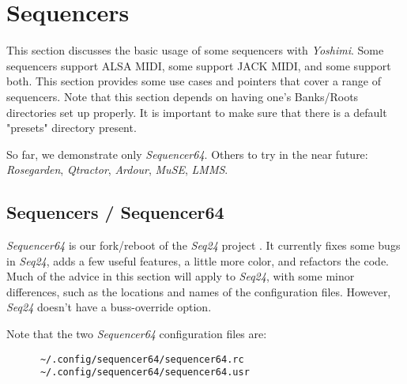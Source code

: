 %
%
%

\section{Sequencers}
\label{sec:sequencers}

   This section discusses the basic usage of some sequencers
   with \textsl{Yoshimi}.
   Some sequencers support ALSA MIDI, some support JACK MIDI, and some
   support both.  This section provides some use cases and pointers that cover
   a range of sequencers.
   Note that this section depends on having one's Banks/Roots directories set
   up properly.  It is important to make sure that there is a default
   "presets" directory present.

   So far, we demonstrate only \textsl{Sequencer64}.
   Others to try in the near future:
      \textsl{Rosegarden},
      \textsl{Qtractor},
      \textsl{Ardour},
      \textsl{MuSE},
      \textsl{LMMS}.

\subsection{Sequencers / Sequencer64}
\label{subsec:sequencers_seq64}

   \textsl{Sequencer64} is our fork/reboot of the \textsl{Seq24}
   project \cite{sequencer64}.
   It currently fixes some bugs in \textsl{Seq24},
   adds a few useful features,
   a little more color, and refactors the code.
   Much of the advice in this section will apply to
   \textsl{Seq24}, with some minor differences, such as the locations and names
   of the configuration files.  However, \textsl{Seq24} doesn't have a
   buss-override option.

   Note that the two \textsl{Sequencer64} configuration files are:

   \begin{verbatim}
      ~/.config/sequencer64/sequencer64.rc
      ~/.config/sequencer64/sequencer64.usr
   \end{verbatim}

